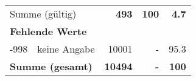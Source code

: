 \begin{longtable}{lXrrr}
     \midrule
     \multicolumn{2}{l}{Summe (gültig)} &
       \textbf{\num{493}} &
     \textbf{100} &
       \textbf{\num[round-mode=places,round-precision=2]{4,7}} \\
     \multicolumn{5}{l}{\textbf{Fehlende Werte}}\\
       -998 &
       keine Angabe &
         \num{10001} &
        - &
         \num[round-mode=places,round-precision=2]{95,3} \\
     \midrule
     \multicolumn{2}{l}{\textbf{Summe (gesamt)}} &
          \textbf{\num{10494}} &
        \textbf{-} &
        \textbf{100} \\
     \bottomrule
     \end{longtable}
     
